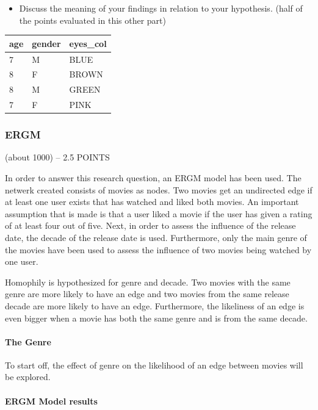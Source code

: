 \documentclass[
  man]{apa6}
\providecommand{\tightlist}{%
  \setlength{\itemsep}{0pt}\setlength{\parskip}{0pt}}
\begin{document}
\begin{itemize}
\tightlist
\item
  Discuss the meaning of your findings in relation to your hypothesis.
  (half of the points evaluated in this other part)
\end{itemize}

\begin{tabular}{l|l|l}
\hline
age & gender & eyes\_col\\
\hline
7 & M & BLUE\\
\hline
8 & F & BROWN\\
\hline
8 & M & GREEN\\
\hline
7 & F & PINK\\
\hline
\end{tabular}

\hypertarget{ergm}{%
\subsubsection{ERGM}\label{ergm}}

(about 1000) -- 2.5 POINTS

In order to answer this research question, an ERGM model has been used.
The netwerk created consists of movies as nodes. Two movies get an
undirected edge if at least one user exists that has watched and liked
both movies. An important assumption that is made is that a user liked a
movie if the user has given a rating of at least four out of five. Next,
in order to assess the influence of the release date, the decade of the
release date is used. Furthermore, only the main genre of the movies
have been used to assess the influence of two movies being watched by
one user.

Homophily is hypothesized for genre and decade. Two movies with the same
genre are more likely to have an edge and two movies from the same
release decade are more likely to have an edge. Furthermore, the
likeliness of an edge is even bigger when a movie has both the same
genre and is from the same decade.

\hypertarget{the-genre}{%
\paragraph{The Genre}\label{the-genre}}

To start off, the effect of genre on the likelihood of an edge between
movies will be explored.

\hypertarget{ergm-model-results}{%
\paragraph{ERGM Model results}\label{ergm-model-results}}
\end{document}
